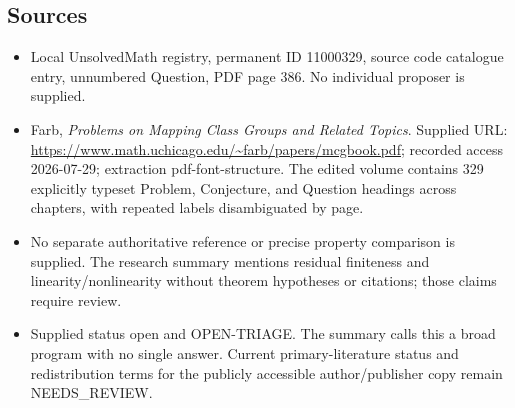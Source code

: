 \documentclass[11pt]{article}
\begin{document}
\subsection{Sources}
\begin{itemize}
\item Local UnsolvedMath registry, permanent ID 11000329, source code catalogue entry, unnumbered Question, PDF page 386. No individual proposer is supplied.
\item Farb, \emph{Problems on Mapping Class Groups and Related Topics}. Supplied URL: \url{https://www.math.uchicago.edu/~farb/papers/mcgbook.pdf}; recorded access 2026-07-29; extraction pdf-font-structure. The edited volume contains 329 explicitly typeset Problem, Conjecture, and Question headings across chapters, with repeated labels disambiguated by page.
\item No separate authoritative reference or precise property comparison is supplied. The research summary mentions residual finiteness and linearity/nonlinearity without theorem hypotheses or citations; those claims require review.
\item Supplied status open and OPEN-TRIAGE. The summary calls this a broad program with no single answer. Current primary-literature status and redistribution terms for the publicly accessible author/publisher copy remain NEEDS\_REVIEW.
\end{itemize}
\end{document}
